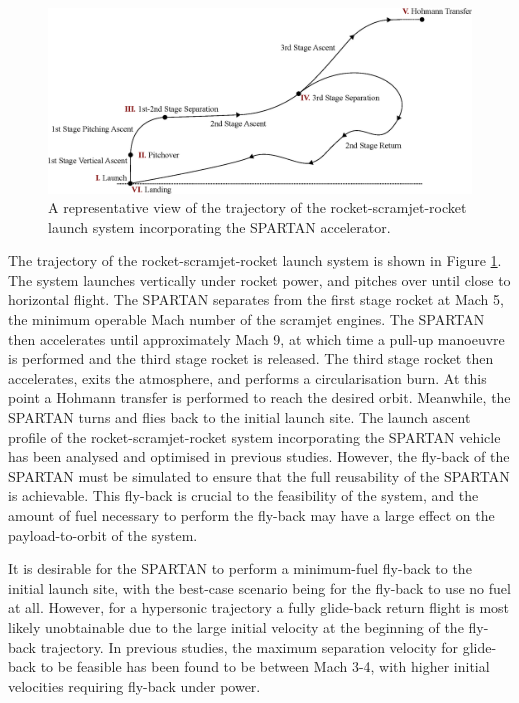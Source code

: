 \documentclass[conf]{new-aiaa}
\begin{document}
\begin{figure}
\centering
\includegraphics[width=0.9\linewidth]{Figures/Traj}
\caption{A representative view of the trajectory of the rocket-scramjet-rocket launch system incorporating the SPARTAN accelerator.}
\label{fig:Traj}
\end{figure}


The trajectory of the rocket-scramjet-rocket launch system is shown in Figure \ref{fig:Traj}. The system launches vertically under rocket power, and pitches over until close to horizontal flight. The SPARTAN separates from the first stage rocket at Mach 5, the minimum operable Mach number of the scramjet engines. The SPARTAN then accelerates until approximately Mach 9, at which time a pull-up manoeuvre is performed and the third stage rocket is released. The third stage rocket then accelerates, exits the atmosphere, and performs a circularisation burn. At this point a Hohmann transfer is performed to reach the desired orbit. Meanwhile, the SPARTAN turns and flies back to the initial launch site.
The launch ascent profile of the rocket-scramjet-rocket system incorporating the SPARTAN vehicle has been analysed and optimised in previous studies. However, the fly-back of the SPARTAN must be simulated to ensure that the full reusability of the SPARTAN is achievable. This fly-back is crucial to the feasibility of the system, and the amount of fuel necessary to perform the fly-back may have a large effect on the payload-to-orbit of the system. 

It is desirable for the SPARTAN to perform a minimum-fuel fly-back to the initial launch site, with the best-case scenario being for the fly-back to use no fuel at all. However, for a hypersonic trajectory a fully glide-back return flight is most likely unobtainable due to the large initial velocity at the beginning of the fly-back trajectory. 
In previous studies, the maximum separation velocity for glide-back to be feasible has been found to be between Mach 3-4, with higher initial velocities requiring fly-back under power.
\end{document}
